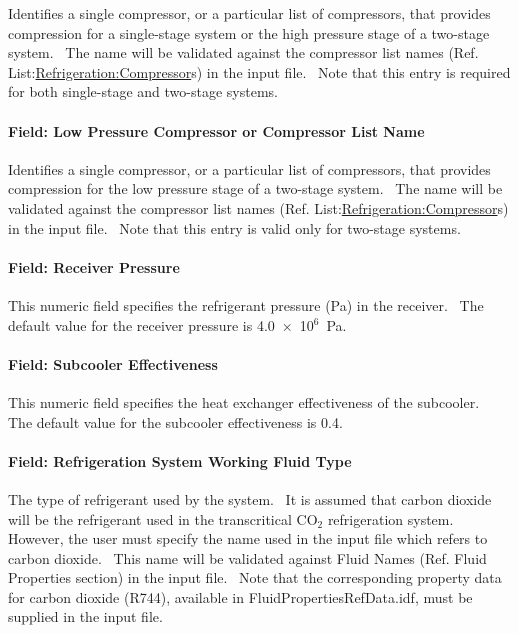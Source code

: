 Identifies a single compressor, or a particular list of compressors, that provides compression for a single-stage system or the high pressure stage of a two-stage system.~ The name will be validated against the compressor list names (Ref. List:\hyperref[refrigerationcompressor]{Refrigeration:Compressor}s) in the input file.~ Note that this entry is required for both single-stage and two-stage systems.

\paragraph{Field: Low Pressure Compressor or Compressor List Name}\label{field-low-pressure-compressor-or-compressor-list-name}

Identifies a single compressor, or a particular list of compressors, that provides compression for the low pressure stage of a two-stage system.~ The name will be validated against the compressor list names (Ref. List:\hyperref[refrigerationcompressor]{Refrigeration:Compressor}s) in the input file.~ Note that this entry is valid only for two-stage systems.

\paragraph{Field: Receiver Pressure}\label{field-receiver-pressure}

This numeric field specifies the refrigerant pressure (Pa) in the receiver.~ The default value for the receiver pressure is 4.0~×~10\(^{6}\)~Pa.

\paragraph{Field: Subcooler Effectiveness}\label{field-subcooler-effectiveness}

This numeric field specifies the heat exchanger effectiveness of the subcooler.~ The default value for the subcooler effectiveness is 0.4.

\paragraph{Field: Refrigeration System Working Fluid Type}\label{field-refrigeration-system-working-fluid-type-1}

The type of refrigerant used by the system.~ It is assumed that carbon dioxide will be the refrigerant used in the transcritical CO\(_{2}\) refrigeration system.~ However, the user must specify the name used in the input file which refers to carbon dioxide.~ This name will be validated against Fluid Names (Ref. Fluid Properties section) in the input file.~ Note that the corresponding property data for carbon dioxide (R744), available in FluidPropertiesRefData.idf, must be supplied in the input file.

